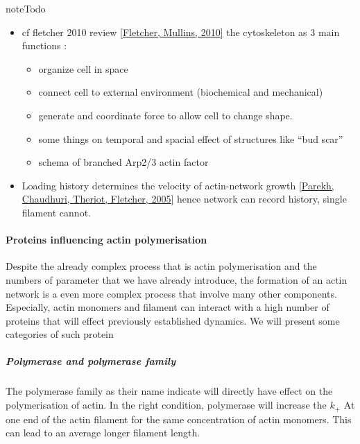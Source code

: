 \documentclass[A4paperpaper,11pt,english]{sphinxmanual}
\begin{document}
\begin{notice}{note}{Todo}
\begin{itemize}
\item {} 
cf fletcher 2010 review {\hyperref[bibitem:fletcher2010]{{[}Fletcher, Mullins,  2010{]}}} the cytoskeleton as 3 main
functions :
\begin{itemize}
\item {} 
organize cell in space

\item {} 
connect cell to external environment (biochemical and mechanical)

\item {} 
generate and coordinate force to allow cell to change shape.

\item {} 
some things on temporal and spacial effect of structures like ``bud scar''

\item {} 
schema of branched Arp2/3 actin factor

\end{itemize}

\item {} 
Loading history determines the velocity of actin-network growth
{\hyperref[bibitem:parekh2005]{{[}Parekh, Chaudhuri, Theriot, Fletcher,  2005{]}}} hence network can record history, single filament
cannot.

\end{itemize}
\end{notice}


\paragraph{Proteins influencing actin polymerisation}
\label{parts/part1:proteins-influencing-actin-polymerisation}
Despite the already complex process that is actin polymerisation and the
numbers of parameter that we have already introduce, the formation of an actin
network is a even more complex process that involve many other components.
Especially, actin monomers and filament can interact with a high number of
proteins that will effect previously established dynamics.  We will present
some categories of such protein


\subparagraph{Polymerase and polymerase family}
\label{parts/part1:polymerase-and-polymerase-family}
The polymerase family as their name indicate will directly have effect on the
polymerisation of actin. In the right condition, polymerase will increase the
\(k_+\) At one end of the actin filament for the same concentration of
actin monomers. This can lead to an average longer filament length.
\end{document}
